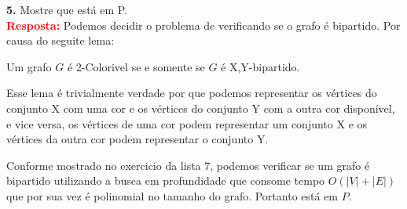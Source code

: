 
\noindent\textbf{5.} Mostre que  está em P.\\[6pt]
\textcolor{red}{\textbf{Resposta:}} Podemos decidir o problema de  verificando se o grafo é bipartido. Por causa do seguite lema:

\begin{lemma}
    \: Um grafo $G$ é 2-Colorivel se e somente se $G$ é X,Y-bipartido.
\end{lemma}

Esse lema é trivialmente verdade por que podemos representar os vértices do conjunto X com uma cor e os vértices do conjunto Y com a outra cor disponível, e vice versa, os vértices de uma cor podem representar um conjunto X e os vértices da outra cor podem representar o conjunto Y.

Conforme mostrado no exercicio da lista 7, podemos verificar se um grafo é bipartido utilizando a busca em profundidade que consome tempo $O(|V| + |E|)$ que por sua vez é polinomial no tamanho do grafo. Portanto  está em $P$.\\[6pt]
